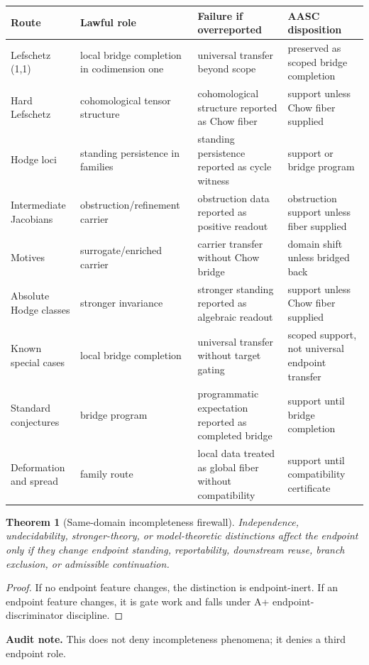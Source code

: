 \documentclass[11pt]{article}
\newtheorem{theorem}{Theorem}[section]
\begin{document}
{\small
\begin{longtable}{p{}p{}p{}p{}}
\toprule
Route & Lawful role & Failure if overreported & AASC disposition\\
\midrule
\endhead
Lefschetz (1,1) & local bridge completion in codimension one & universal transfer beyond scope & preserved as scoped bridge completion\\
Hard Lefschetz & cohomological tensor structure & cohomological structure reported as Chow fiber & support unless Chow fiber supplied\\
Hodge loci & standing persistence in families & standing persistence reported as cycle witness & support or bridge program\\
Intermediate Jacobians & obstruction/refinement carrier & obstruction data reported as positive readout & obstruction support unless fiber supplied\\
Motives & surrogate/enriched carrier & carrier transfer without Chow bridge & domain shift unless bridged back\\
Absolute Hodge classes & stronger invariance & stronger standing reported as algebraic readout & support unless Chow fiber supplied\\
Known special cases & local bridge completion & universal transfer without target gating & scoped support, not universal endpoint transfer\\
Standard conjectures & bridge program & programmatic expectation reported as completed bridge & support until bridge completion\\
Deformation and spread & family route & local data treated as global fiber without compatibility & support until compatibility certificate\\
\bottomrule
\end{longtable}
}

\begin{theorem}[Same-domain incompleteness firewall]
Independence, undecidability, stronger-theory, or model-theoretic distinctions affect the endpoint only if they change endpoint standing, reportability, downstream reuse, branch exclusion, or admissible continuation.
\end{theorem}
\begin{proof}
If no endpoint feature changes, the distinction is endpoint-inert. If an endpoint feature changes, it is gate work and falls under A+ endpoint-discriminator discipline.
\end{proof}
\par\noindent\textbf{Audit note.} This does not deny incompleteness phenomena; it denies a third endpoint role.
\end{document}
